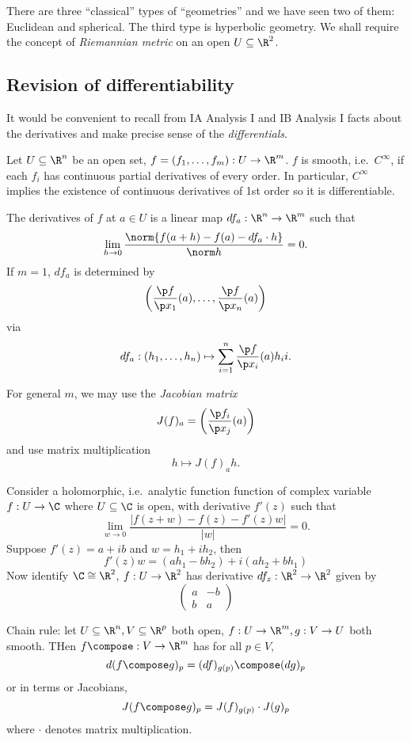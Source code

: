 \documentclass[a4paper]{article}
\theoremstyle{definition}
\begin{document}
There are three ``classical'' types of ``geometries'' and we have seen two of them: Euclidean and spherical. The third type is hyperbolic geometry. We shall require the concept of \emph{Riemannian metric} on an open \(U \subseteq \R^2\).


\subsection{Revision of differentiability}

It would be convenient to recall from IA Analysis I and IB Analysis I facts about the derivatives and make precise sense of the \emph{differentials}.

Let \(U \subseteq \R^n\) be an open set, \(f = (f_1, \dots, f_m): U \to \R^m\). \(f\) is smooth, i.e.\ \(C^\infty\), if each \(f_i\) has continuous partial derivatives of every order. In particular, \(C^\infty\) implies the existence of continuous derivatives of 1st order so it is differentiable.

The derivatives of \(f\) at \(a \in U\) is a linear map \(df_a: \R^n \to \R^m\) such that
\[
  \lim_{h \to 0} \frac{\norm{f(a + h) - f(a) - df_a \cdot h}}{\norm h} = 0.
\]
If \(m = 1\), \(df_a\) is determined by
\[
  \left( \frac{\p f}{\p x_1}(a), \dots, \frac{\p f}{\p x_n}(a) \right)
\]
via
\[
  df_a: (h_1, \dots, h_n) \mapsto \sum_{i = 1}^n \frac{\p f}{\p x_i}(a) h_ii.
\]

For general \(m\), we may use the \emph{Jacobian matrix}
\[
  J(f)_a = \left( \frac{\p f_i}{\p x_j}(a) \right)
\]
and use matrix multiplication
\[
  h \mapsto J(f)_ah.
\]

\begin{eg}
  Consider a holomorphic, i.e.\ analytic function function of complex variable \(f: U \to \C\) where \(U \subseteq \C\) is open, with derivative \(f'(z)\) such that
  \[
    \lim_{w \to 0} \frac{|f(z + w) - f(z) - f'(z)w|}{|w|} = 0.
  \]
  Suppose \(f'(z) = a + ib\) and \(w = h_1 + ih_2\), then
  \[
    f'(z)w = (ah_1 - bh_2) + i(ah_2 + bh_1)
  \]
  Now identify \(\C \cong \R^2\), \(f: U \to \R^2\) has derivative \(df_z: \R^2 \to \R^2\) given by
  \[
    \begin{pmatrix}
      a & -b \\
      b & a
    \end{pmatrix}
  \]
\end{eg}

Chain rule: let \(U \subseteq \R^n, V \subseteq \R^p\) both open, \(f: U \to \R^m, g: V \to U\) both smooth. THen \(f \compose: V \to \R^m\) has for all \(p \in V\),
\[
  d(f \compose g)_p = (df)_{g(p)} \compose (dg)_p
\]
or in terms or Jacobians,
\[
  J(f \compose g)_p = J(f)_{g(p)} \cdot J(g)_p
\]
where \(\cdot\) denotes matrix multiplication.
\end{document}
